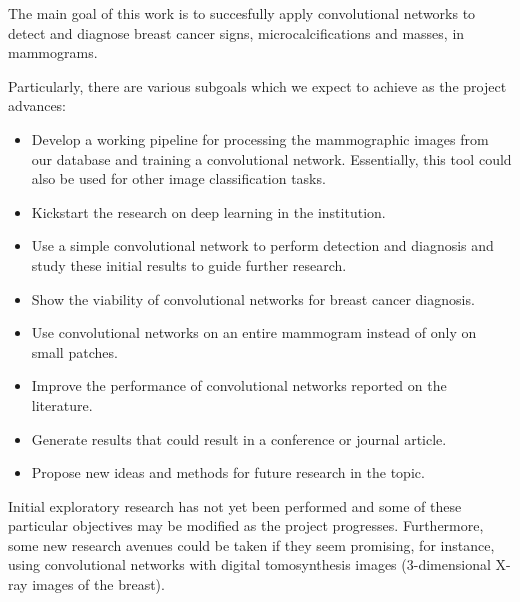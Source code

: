 The main goal of this work is to succesfully apply convolutional networks to detect and diagnose breast cancer signs, microcalcifications and masses, in mammograms. 

Particularly, there are various subgoals which we expect to achieve as the project advances:
\begin{itemize}
	\item Develop a working pipeline for processing the mammographic images from our database and training a convolutional network. Essentially, this tool could also be used for other image classification tasks.
	\item Kickstart the research on deep learning in the institution.
	\item Use a simple convolutional network to perform detection and diagnosis and study these initial results to guide further research.
	\item Show the viability of convolutional networks for breast cancer diagnosis.
	\item Use convolutional networks on an entire mammogram instead of only on small patches.
	\item Improve the performance of convolutional networks reported on the literature.
	\item Generate results that could result in a conference or journal article.
	\item Propose new ideas and methods for future research in the topic.
\end{itemize}
Initial exploratory research has not yet been performed and some of these particular objectives may be modified as the project progresses. Furthermore, some new research avenues could be taken if they seem promising, for instance, using convolutional networks with digital tomosynthesis images (3-dimensional X-ray images of the breast).


\begin{comment}
Especificar en esta sección qué es lo que quiere lograr con respecto al problema identificado
en forma general y particular. Puede incluir alcances y cualquier otro
elemento que considere pertinente para delimitar su trabajo. 

{\bf Por ejemplo:}

El objetivo general de este trabajo.......

Los objetivos particulares a cumplir en este trabajo de investigación son los
siguientes: 
\begin{itemize}
	\item El primer objetivo...
	\item El segundo objetivo...
\end{itemize}

Esta sección puede contener también el {\it Modelo Particular}, que es el modelo de solución propuesto para el
problema y que obviamente debe ser consistente con los objetivos
establecidos. Se le llama {\it Modelo Particular}
 porque es en el cual se guía
el trabajo de investigación y que desemboca en lo que es la
 {\bf CONTRIBUCIÓN PERSONAL}.
Aquí es donde los aspectos de creatividad e innovación deben verse aplicados a nuestro
trabajo.
\end{comment}
